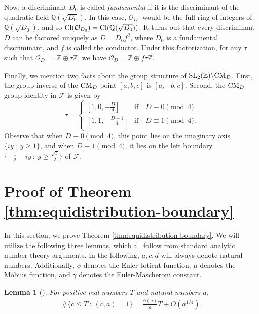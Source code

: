 \documentclass[11pt,letterpaper,reqno]{amsart}
\newtheorem{lemma}[theorem]{Lemma}
\numberwithin{equation}{section}
\numberwithin{figure}{section}
\numberwithin{table}{section}
\newcommand{\ZZ}{\mathbb{Z}}
\newcommand{\QQ}{\mathbb{Q}}
\newcommand{\SL}{\text{SL}}
\newcommand{\FF}{\mathcal{F}}
\newcommand{\CM}{\textnormal{CM}}
\newcommand{\Or}[1]{\mathcal{O}_{#1}}
\newcommand{\Cl}[1]{\textnormal{Cl}(\mathcal{O}_{#1})}
\def \t {\tau}
\begin{document}
 
Now, a discriminant $D_0$ is called \textit{fundamental} if it is the discriminant of the quadratic field $\QQ(\sqrt{D_0})$. In this case, $\Or{D_0}$ would be the full ring of integers of $\QQ(\sqrt{D_0})$, and so $\Cl{D_0} =\text{Cl}(\QQ(\sqrt{D_0}))$.
It turns out that every discriminant $D$ can be factored uniquely as $D = D_0f^2$, where $D_0$ is a fundamental discriminant, and $f$ is called the conductor. Under this factorization, for any $\t$ such that $\Or{D_0} = \ZZ \oplus \tau \ZZ$, we have $\Or{D} = \ZZ \oplus f \tau \ZZ$.




Finally, we mention two facts about the group structure of $\SL_2(\ZZ) \backslash \CM_D$. First, the group inverse of the $\CM_D$ point $[a,b,c]$ is $[a,-b,c]$. Second, the $\CM_D$ group identity in $\FF$ is given by
\begin{equation} \label{eqn:identity-CM-pts}
    \tau = \begin{cases}
        [1, 0, -\frac{D}{4}] & \text{if} \quad D \equiv 0 \pmod{4} \\
        [1, 1, -\frac{D-1}{4}] & \text{if} \quad  D \equiv 1 \pmod{4}. \\
    \end{cases}
\end{equation}
Observe that when $D \equiv 0 \pmod{4}$, this point lies on the imaginary axis $\{iy \ :\ y \ge 1\}$, and when $D \equiv 1 \pmod{4}$, it lies on the left boundary $\{-\frac{1}{2} + iy \ :\ y \ge \frac{\sqrt{3}}{2}\}$ of $\FF$.
















\section{Proof of Theorem \ref{thm:equidistribution-boundary}} \label{sec:equidistribution-boundary}




In this section, we prove Theorem \ref{thm:equidistribution-boundary}.
We will utilize the following three lemmas, which all follow from standard analytic number theory arguments.
In the following, $a,c,d$ will always denote natural numbers. Additionally, $\phi$ denotes the Euler totient function, $\mu$ denotes the Mobius function, and $\gamma$ denotes the Euler-Mascheroni constant.
\begin{lemma}[{\cite[p. 393]{niven-zuckerman-montgomery}}] \label{lem:count-coprime-range}
    For positive real numbers $T$ and natural numbers $a$,
    \begin{align}
        \#\{c \le T ~:~ (c,a)=1\} = \frac{\phi(a)}{a} T + O(a^{1/4}).
    \end{align}
\end{lemma}
\end{document}

